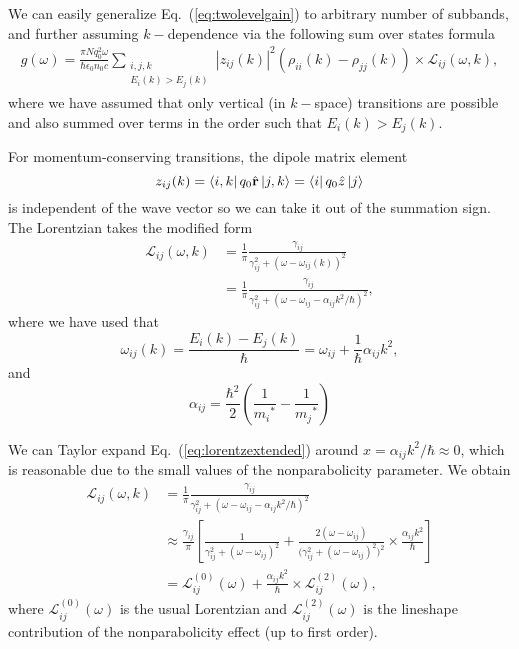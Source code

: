 \documentclass[preprint,secnumarabic,amssymb, nobibnotes, aip, prd]{revtex4-1}
\def\bm{\mathbf}
\begin{document}
We can easily generalize Eq.~(\ref{eq:twolevelgain}) to arbitrary number of subbands, and further assuming $k-$dependence via the following sum over states formula
\begin{align}
\label{eq:generalgain}
g(\omega) = \frac{\pi Nq_0^2\omega}{\hbar\epsilon_0n_0c}\sum_{\substack{i,j,k \\ E_i(k)>E_j(k)}}|z_{ij}(k)|^2(\rho_{ii}(k)-\rho_{jj}(k))\times\mathcal{L}_{ij}(\omega,k),
\end{align}
where we have assumed that only vertical (in $k-$space) transitions are possible and also summed over terms in the order such that $ E_i(k)>E_j(k)$. 

For momentum-conserving transitions, the dipole matrix element $$z_{ij}(k) = \bra{i,k}q_0\hat{\bm r}\ket{j,k} = \bra{i}q_0\hat{z}\ket{j}$$ 
is independent of the wave vector so we can take it out of the summation sign. The Lorentzian takes the modified form
\begin{align}
\label{eq:lorentzextended}
\mathcal{L}_{ij}(\omega,k) &= \frac{1}{\pi} \frac{\gamma_{ij}}{\gamma_{ij}^2+(\omega-\omega_{ij}(k))^2} \nonumber \\
			&=  \frac{1}{\pi} \frac{\gamma_{ij}}{\gamma_{ij}^2+(\omega-\omega_{ij} -\alpha_{ij}k^2/\hbar)^2},
\end{align}
where we have used that 
$$
\omega_{ij}(k) = \frac{E_i(k)-E_j(k)}{\hbar}=\omega_{ij}+\frac{1}{\hbar}\alpha_{ij}k^2,
$$
and $$\alpha_{ij} = \frac{\hbar^2}{2}(\frac{1}{{m_i}^*}-\frac{1}{{m_j}^*})$$

We can Taylor expand Eq.~(\ref{eq:lorentzextended}) around $x = \alpha_{ij}k^2/\hbar \approx 0$, which is reasonable due to the small values of the nonparabolicity parameter. We obtain
\begin{align}
\label{eq:lorentztaylor}
\mathcal{L}_{ij}(\omega,k) &= \frac{1}{\pi} \frac{\gamma_{ij}}{\gamma_{ij}^2+(\omega-\omega_{ij} -\alpha_{ij}k^2/\hbar)^2} \nonumber \\
&\approx  \frac{\gamma_{ij}}{\pi}  \left[\frac{1}{\gamma_{ij}^2+(\omega-\omega_{ij})^2} + \frac{2(\omega-\omega_{ij})}{\big(\gamma_{ij}^2+(\omega-\omega_{ij})^2 \big)^2}\times\frac{\alpha_{ij}k^2}{\hbar} \right] \nonumber \\
& = \mathcal{L}_{ij}^{(0)}(\omega) + \frac{\alpha_{ij}k^2}{\hbar}\times \mathcal{L}_{ij}^{(2)}(\omega),
\end{align}
where $\mathcal{L}_{ij}^{(0)}(\omega)$ is the usual Lorentzian and $\mathcal{L}_{ij}^{(2)}(\omega)$ is the lineshape contribution of the nonparabolicity effect (up to first order).
\end{document}
